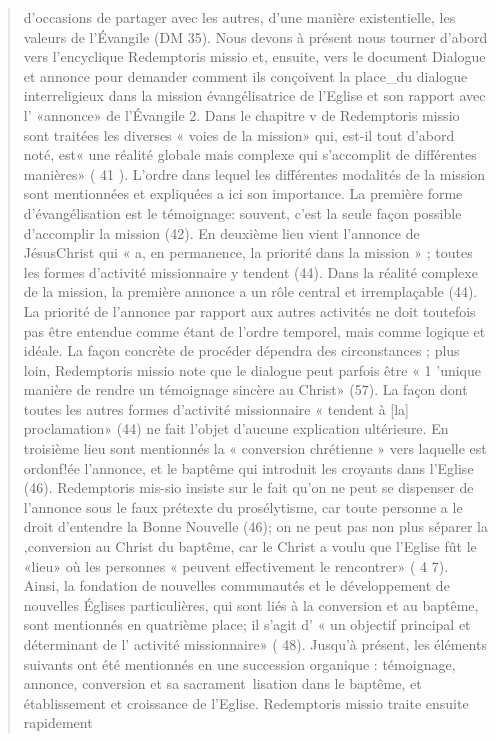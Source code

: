 \begin{quote}
d'occasions de partager avec les autres, d'une manière existentielle,
les valeurs de l'Évangile (DM 35).
Nous devons à présent nous tourner d'abord vers l'encyclique
Redemptoris missio et, ensuite, vers le document Dialogue
et annonce pour demander comment ils conçoivent la
place_du dialogue interreligieux dans la mission évangélisatrice
de l'Eglise et son rapport avec l' «annonce» de l'Évangile 2.
Dans le chapitre v de Redemptoris missio sont traitées les
diverses « voies de la mission» qui, est-il tout d'abord noté,
est« une réalité globale mais complexe qui s'accomplit de différentes
manières» ( 41 ). L'ordre dans lequel les différentes
modalités de la mission sont mentionnées et expliquées a ici
son importance. La première forme d'évangélisation est le
témoignage: souvent, c'est la seule façon possible d'accomplir
la mission (42). En deuxième lieu vient l'annonce de JésusChrist
qui « a, en permanence, la priorité dans la mission » ;
toutes les formes d'activité missionnaire y tendent (44). Dans
la réalité complexe de la mission, la première annonce a un
rôle central et irremplaçable (44). La priorité de l'annonce par
rapport aux autres activités ne doit toutefois pas être entendue
comme étant de l'ordre temporel, mais comme logique et
idéale. La façon concrète de procéder dépendra des circonstances
; plus loin, Redemptoris missio note que le dialogue
peut parfois être « 1 'unique manière de rendre un témoignage
sincère au Christ» (57). La façon dont toutes les autres formes
d'activité missionnaire « tendent à [la] proclamation» (44) ne
fait l'objet d'aucune explication ultérieure.
En troisième lieu sont mentionnés la « conversion chrétienne
» vers laquelle est ordonf!ée l'annonce, et le baptême
qui introduit les croyants dans l'Eglise (46). Redemptoris mis-sio insiste sur le fait qu'on ne peut se dispenser de l'annonce
sous le faux prétexte du prosélytisme, car toute personne a le
droit d'entendre la Bonne Nouvelle (46); on ne peut pas non
plus séparer la ,conversion au Christ du baptême, car le Christ
a voulu que l'Eglise fût le «lieu» où les personnes « peuvent
effectivement le rencontrer» ( 4 7). Ainsi, la fondation de nouvelles
communautés et le développement de nouvelles Églises
particulières, qui sont liés à la conversion et au baptême, sont
mentionnés en quatrième place; il s'agit d' « un objectif principal
et déterminant de l' activité missionnaire» ( 48).
Jusqu'à présent, les éléments suivants ont été mentionnés en
une succession organique : témoignage, annonce, conversion
et sa sacrament~lisation dans le baptême, et établissement et
croissance de l'Eglise. Redemptoris missio traite ensuite rapidement

\end{quote}
